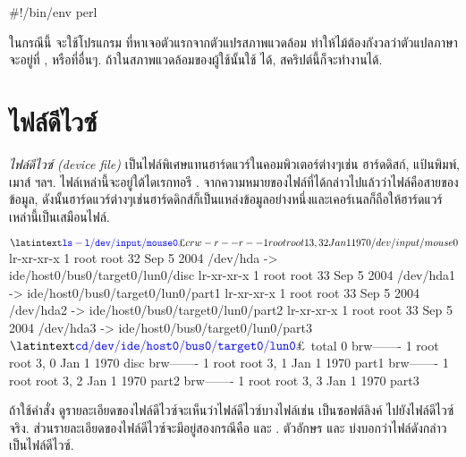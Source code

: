 \begin{thwbr}
\begin{MyVerbatim}
#!/bin/env perl
\end{MyVerbatim}

ในกรณีนี้  จะใช้โปรแกรม  ที่หาเจอตัวแรกจากตัวแปรสภาพแวดล้อม  ทำให้ไม้ต้องกังวลว่าตัวแปลภาษา  จะอยู่ที่ ,  หรือที่อื่นๆ. ถ้าในสภาพแวดล้อมของผู้ใช้นั้นใช้  ได้, สคริปต์นี้ก็จะทำงานได้.


\section{ไฟล์ดีไวซ์}
\emph{ไฟล์ดีไวซ์ (device file)} เป็นไฟล์พิเศษแทนฮาร์ดแวร์ในคอมพิวเตอร์ต่างๆเช่น ฮาร์ดดิสก์, แป้นพิมพ์, เมาส์ ฯลฯ. ไฟล์เหล่านี้จะอยู่ใต้ไดเรกทอรี . จากความหมายของไฟล์ที่ได้กล่าวไปแล้วว่าไฟล์คือสายของข้อมูล, ดังนั้นฮาร์ดแวร์ต่างๆเช่นฮาร์ดดิกส์ก็เป็นแหล่งข้อมูลอย่างหนึ่งและเคอร์เนลก็ถือให้ฮาร์ดแวร์เหล่านี้เป็นเสมือนไฟล์.

\begin{MyExample}\label{ex:lsdevice}
\begin{MyEx}
$ \cin{ls -l /dev/input/mouse0}
crw-r--r--    1 root     root      13,  32 Jan  1  1970 /dev/input/mouse0
$ 
lr-xr-xr-x    1 root     root           32 Sep  5  2004 /dev/hda -> \wrap
ide/host0/bus0/target0/lun0/disc
lr-xr-xr-x    1 root     root           33 Sep  5  2004 /dev/hda1 -> \wrap
ide/host0/bus0/target0/lun0/part1
lr-xr-xr-x    1 root     root           33 Sep  5  2004 /dev/hda2 -> \wrap
ide/host0/bus0/target0/lun0/part2
lr-xr-xr-x    1 root     root           33 Sep  5  2004 /dev/hda3 -> \wrap
ide/host0/bus0/target0/lun0/part3
$ \cin{cd /dev/ide/host0/bus0/target0/lun0}
$ 
total 0
brw-------    1 root     root       3,   0 Jan  1  1970 disc
brw-------    1 root     root       3,   1 Jan  1  1970 part1
brw-------    1 root     root       3,   2 Jan  1  1970 part2
brw-------    1 root     root       3,   3 Jan  1  1970 part3
\end{MyEx}
\end{MyExample}

ถ้าใช้คำสั่ง  ดูรายละเอียดของไฟล์ดีไวซ์จะเห็นว่าไฟล์ดีไวซ์บางไฟล์เช่น  เป็นซอฟต์ลิงค์ ไปยังไฟล์ดีไวซ์จริง. ส่วนรายละเอียดของไฟล์ดีไวซ์จะมีอยู่สองกรณีคือ  และ . ตัวอักษร  และ  บ่งบอกว่าไฟล์ดังกล่าวเป็นไฟล์ดีไวซ์. 


\end{thwbr}
